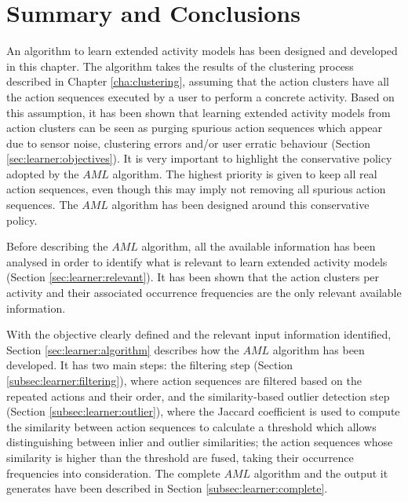 \section{Summary and Conclusions}
\label{sec:learner:summary}

An algorithm to learn extended activity models has been designed and developed in this chapter. The algorithm takes the results of the clustering process described in Chapter \ref{cha:clustering}, assuming that the action clusters have all the action sequences executed by a user to perform a concrete activity. Based on this assumption, it has been shown that learning extended activity models from action clusters can be seen as purging spurious action sequences which appear due to sensor noise, clustering errors and/or user erratic behaviour (Section \ref{sec:learner:objectives}). It is very important to highlight the conservative policy adopted by the $AML$ algorithm. The highest priority is given to keep all real action sequences, even though this may imply not removing all spurious action sequences. The $AML$ algorithm has been designed around this conservative policy.

Before describing the $AML$ algorithm, all the available information has been analysed in order to identify what is relevant to learn extended activity models (Section \ref{sec:learner:relevant}). It has been shown that the action clusters per activity and their associated occurrence frequencies are the only relevant available information.

With the objective clearly defined and the relevant input information identified, Section \ref{sec:learner:algorithm} describes how the $AML$ algorithm has been developed. It has two main steps: the filtering step (Section \ref{subsec:learner:filtering}), where action sequences are filtered based on the repeated actions and their order, and the similarity-based outlier detection step (Section \ref{subsec:learner:outlier}), where the Jaccard coefficient is used to compute the similarity between action sequences to calculate a threshold which allows distinguishing between inlier and outlier similarities; the action sequences whose similarity is higher than the threshold are fused, taking their occurrence frequencies into consideration. The complete $AML$ algorithm and the output it generates have been described in Section \ref{subsec:learner:complete}. 

